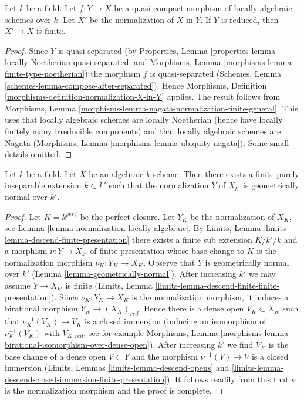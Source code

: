 \begin{lemma}
\label{lemma-relative-normalization-finite}
Let $k$ be a field. Let $f : Y \to X$ be a quasi-compact
morphism of locally algebraic schemes over $k$. Let $X'$
be the normalization of $X$ in $Y$. If $Y$ is reduced, then
$X' \to X$ is finite.
\end{lemma}

\begin{proof}
Since $Y$ is quasi-separated (by
Properties, Lemma \ref{properties-lemma-locally-Noetherian-quasi-separated} and
Morphisms, Lemma \ref{morphisms-lemma-finite-type-noetherian})
the morphism $f$ is quasi-separated
(Schemes, Lemma \ref{schemes-lemma-compose-after-separated}).
Hence Morphisms, Definition \ref{morphisms-definition-normalization-X-in-Y}
applies. The result follows from Morphisms, Lemma
\ref{morphisms-lemma-nagata-normalization-finite-general}.
This uses that locally algebraic schemes are locally Noetherian
(hence have locally finitely many irreducible components)
and that locally algebraic schemes are Nagata
(Morphisms, Lemma \ref{morphisms-lemma-ubiquity-nagata}).
Some small details omitted.
\end{proof}

\begin{lemma}
\label{lemma-finite-extension-geometrically-normal}
Let $k$ be a field. Let $X$ be an algebraic $k$-scheme.
Then there exists a finite purely inseparable extension $k \subset k'$
such that the normalization $Y$ of $X_{k'}$ is geometrically normal over $k'$.
\end{lemma}

\begin{proof}
Let $K = k^{perf}$ be the perfect closure. Let $Y_K$ be the
normalization of $X_K$, see Lemma \ref{lemma-normalization-locally-algebraic}.
By Limits, Lemma \ref{limits-lemma-descend-finite-presentation}
there exists a finite sub extension $K/k'/k$ and a morphism
$\nu : Y \to X_{k'}$ of finite presentation whose base change to $K$
is the normalization morphism $\nu_K : Y_K \to X_K$.
Observe that $Y$ is geometrically normal over $k'$
(Lemma \ref{lemma-geometrically-normal}).
After increasing $k'$ we may assume $Y \to X_{k'}$ is finite
(Limits, Lemma \ref{limits-lemma-descend-finite-finite-presentation}).
Since $\nu_K : Y_K \to X_K$ is the normalization morphism,
it induces a birational morphism $Y_K \to (X_K)_{red}$.
Hence there is a dense open $V_K \subset X_K$ such that
$\nu_K^{-1}(V_K) \to V_K$ is a closed immersion
(inducing an isomorphism of $\nu_K^{-1}(V_K)$ with $V_{K, red}$, see
for example Morphisms, Lemma
\ref{morphisms-lemma-birational-isomorphism-over-dense-open}).
After increasing $k'$ we find $V_K$ is the base change of a dense open
$V \subset Y$ and the morphism $\nu^{-1}(V) \to V$ is a closed immersion
(Limits, Lemmas \ref{limits-lemma-descend-opens} and
\ref{limits-lemma-descend-closed-immersion-finite-presentation}).
It follows readily from this that $\nu$ is the normalization
morphism and the proof is complete.
\end{proof}

